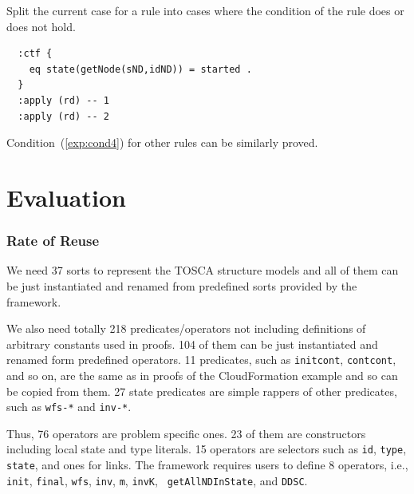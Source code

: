 \documentclass[12pt]{report}
\begin{document}
 Split the current case for a rule into
cases where the condition of the rule does or does not hold. 
\small
\begin{verbatim}
  :ctf {
    eq state(getNode(sND,idND)) = started .
  }
  :apply (rd) -- 1
  :apply (rd) -- 2
\end{verbatim}
\normalsize
Condition~(\ref{exp:cond4}) for other rules can be similarly proved.

\section{Evaluation}
\label{sec:evaluation}
\subsubsection{Rate of Reuse}
We need 37 sorts to represent the TOSCA structure models and all of
them can be just instantiated and renamed from predefined sorts
provided by the framework.

We also need totally 218 predicates/operators not including
definitions of arbitrary constants used in proofs. 104 of them can be
just instantiated and renamed form predefined operators. 11
predicates, such as {\tt initcont}, {\tt contcont}, and so on, are the
same as in proofs of the CloudFormation example and so can be copied
from them.  27 state predicates are simple rappers of other
predicates, such as {\tt wfs-*} and {\tt inv-*}.

Thus, 76 operators are problem specific ones. 23 of them are
constructors including local state and type literals. 15 operators are
selectors such as {\tt id}, {\tt type}, {\tt state}, and ones for
links. The framework requires users to define 8 operators, i.e., {\tt
  init}, {\tt final}, {\tt wfs}, {\tt inv}, {\tt m}, {\tt invK}, {\tt
  getAllNDInState}, and {\tt DDSC}.
\end{document}
